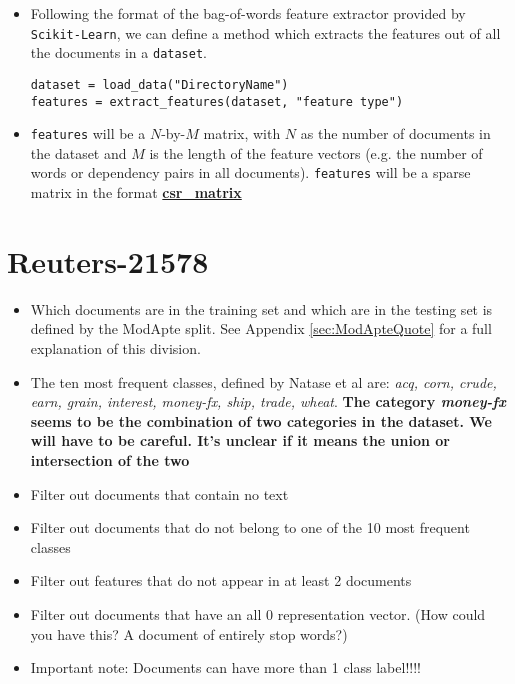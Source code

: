 \documentclass[12pt]{article}
\newcommand{\bt}[1]{\textbf{#1}}
\begin{document}
\begin{itemize}
\item Following the format of the bag-of-words feature extractor provided by {\tt Scikit-Learn}, we can define a method which extracts the features out of all the documents in a {\tt dataset}. 
\begin{lstlisting}
dataset = load_data("DirectoryName")
features = extract_features(dataset, "feature type")
\end{lstlisting}
\item {\tt features} will be a $N$-by-$M$ matrix, with $N$ as the number of documents in the dataset and $M$ is the length of the feature vectors (e.g. the number of words or dependency pairs in all documents). {\tt features} will be a sparse matrix in the format \href{http://docs.scipy.org/doc/scipy/reference/sparse.html}{\bt{csr\_matrix}}
\end{itemize}
  
\section{Reuters-21578}

\begin{itemize}
\item Which documents are in the training set and which are in the testing set is defined by the ModApte split.  See Appendix \hyperref[sec:ModApteQuote]{\ref{sec:ModApteQuote}} for a full explanation of this division.
\item The ten most frequent classes, defined by Natase et al are: \emph{acq, corn, crude, earn, grain, interest, money-fx, ship, trade, wheat}. \bt{The category \emph{money-fx} seems to be the combination of two categories in the dataset. We will have to be careful. It's unclear if it means the union or intersection of the two}
\item Filter out documents that contain no text 
\item Filter out documents that do not belong to one of the 10 most frequent classes
\item Filter out features that do not appear in at least 2 documents
\item Filter out documents that have an all 0 representation vector. (How could you have this? A document of entirely stop words?)
\item Important note: Documents can have more than 1 class label!!!!
\end{itemize}  

\newpage
\appendix
\end{document}
